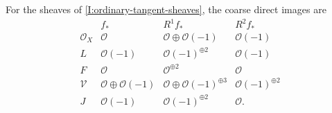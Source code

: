 \begin{theorem}\hypertarget{tag-02YN}{}\label{night:P5.2}\label{stmt:P5.2}
For the sheaves of \cref{I:ordinary-tangent-sheaves}, the coarse
direct images are
\[
\begin{array}{c|ccc}
 & f_* & R^1f_* &R^2f_*\\ \hline
 \mathcal O_X&\mathcal O&\mathcal O\oplus\mathcal O(-1)&\mathcal O(-1)\\
 L&\mathcal O(-1)&\mathcal O(-1)^{\oplus2}&\mathcal O(-1)\\
 F&\mathcal O&\mathcal O^{\oplus2}&\mathcal O\\
 \mathcal V&\mathcal O\oplus\mathcal O(-1)&\mathcal O\oplus\mathcal O(-1)^{\oplus3}
       &\mathcal O(-1)^{\oplus2}\\
 J&\mathcal O(-1)&\mathcal O(-1)^{\oplus2}&\mathcal O .
\end{array}
\]
\end{theorem}
